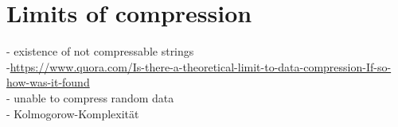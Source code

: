 \section{Limits of compression}
\label{ch:Principles of compression:sec:Limits of Conpression}

- existence of not compressable strings\\
-\url{https://www.quora.com/Is-there-a-theoretical-limit-to-data-compression-If-so-how-was-it-found} \\
- unable to compress random data\\
- Kolmogorow-Komplexität	

